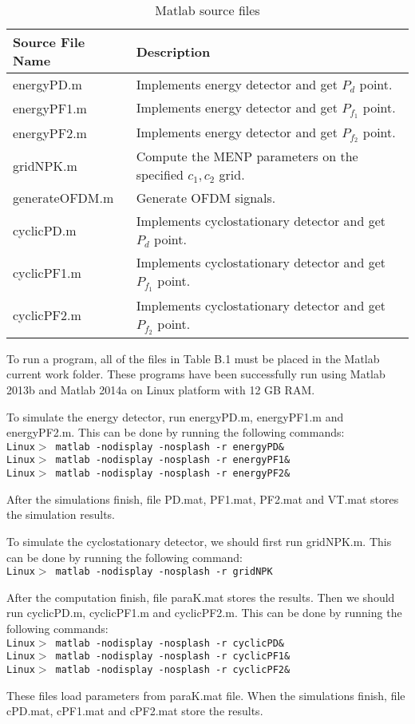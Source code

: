 \begin{table}[h]
\begin{tabular}{l|p{350pt}}
\hline
\hline
Source File Name                  & Description                                                                \\ \hline
energyPD.m                  &       Implements energy detector and get $P_d$ point. \\
energyPF1.m                 &        Implements energy detector and get $P_{f_1}$ point. \\
energyPF2.m                 &        Implements energy detector and get $P_{f_2}$ point. \\
gridNPK.m                   &       Compute the MENP parameters on the specified $c_1, c_2$ grid.\\
generateOFDM.m              &       Generate OFDM signals.                          \\
cyclicPD.m                  &       Implements cyclostationary detector and get $P_d$ point.    \\
cyclicPF1.m                 &       Implements cyclostationary detector and get $P_{f_1}$ point.    \\
cyclicPF2.m                 &        Implements cyclostationary detector and get $P_{f_2}$ point.    \\
\hline
\end{tabular}
\label{filelist}
\caption{Matlab source files}
\end{table}

To run a program, all of the files in Table B.1 must be placed in the Matlab current work folder. These programs have been successfully run using Matlab 2013b and Matlab 2014a on Linux platform with 12 GB RAM.  

To simulate the energy detector, run energyPD.m, energyPF1.m and energyPF2.m. This can be done by running the following commands:
\\\texttt{Linux$>$ matlab -nodisplay -nosplash -r energyPD\&}
\\\texttt{Linux$>$ matlab -nodisplay -nosplash -r energyPF1\&}
\\\texttt{Linux$>$ matlab -nodisplay -nosplash -r energyPF2\&}

After the simulations finish, file PD.mat, PF1.mat, PF2.mat and VT.mat  stores the simulation results.

To simulate the cyclostationary detector, we should first run gridNPK.m. This can be done by running the following command:
\\\texttt{Linux$>$ matlab -nodisplay -nosplash -r gridNPK}

After the computation finish, file paraK.mat stores the results. Then we should run cyclicPD.m, cyclicPF1.m and cyclicPF2.m. This can be done by running the following commands:
\\\texttt{Linux$>$ matlab -nodisplay -nosplash -r cyclicPD\&}
\\\texttt{Linux$>$ matlab -nodisplay -nosplash -r cyclicPF1\&}
\\\texttt{Linux$>$ matlab -nodisplay -nosplash -r cyclicPF2\&}

These files load parameters from paraK.mat file. When the simulations finish, file cPD.mat, cPF1.mat and cPF2.mat store the results. 
